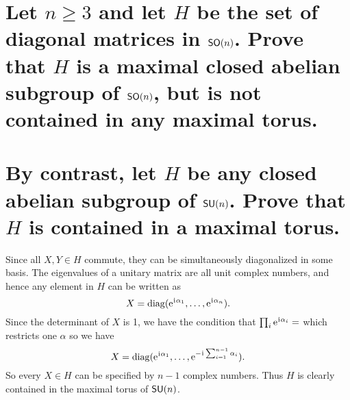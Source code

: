 \documentclass[
	pages,
	boxes,
	color=WildStrawberry
]{homework}
\begin{document}
\begin{problem}
\begin{parts}
	\part{Let $n \geq 3$ and let $H$ be the set of diagonal matrices in $\mathsf{SO}(n)$. Prove that $H$ is a maximal closed abelian subgroup of $\mathsf{SO}(n)$, but is not contained in any maximal torus.}\label{part:5a}
	\part{By contrast, let $H$ be any closed abelian subgroup of $\mathsf{SU}(n)$. Prove that $H$ is contained in a maximal torus.}\label{part:5b}
\end{parts}
\end{problem}

\begin{solution}
	\ref{part:5a}

	\ref{part:5b}
	Since all $X, Y\in H$ commute, they can be simultaneously diagonalized in some basis. The eigenvalues of a unitary matrix are all unit complex numbers, and hence any element in $H$ can be written as
	\begin{equation*}
		X = \operatorname{diag}(\mathrm{e}^{\mkern1mu\mathrm{i}\mkern1mu\alpha_1},\ldots, \mathrm{e}^{\mkern1mu\mathrm{i}\mkern1mu\alpha_n}).
	\end{equation*}
	Since the determinant of $X$ is 1, we have the condition that $\prod_i\mathrm{e}^{\mkern1mu\mathrm{i}\mkern1mu\alpha_i} = $ which restricts one $\alpha$ so we have
	\begin{equation*}
		X = \operatorname{diag}(\mathrm{e}^{\mkern1mu\mathrm{i}\mkern1mu\alpha_1},\ldots, \mathrm{e}^{-\mkern1mu\mathrm{i}\mkern1mu \sum_{i = 1}^{n-1}\alpha_i}).
	\end{equation*}
	So every $X\in H$ can be specified by $n-1$ complex numbers. Thus $H$ is clearly contained in the maximal torus of $\mathsf{SU}(n)$.
\end{solution}
\end{document}
